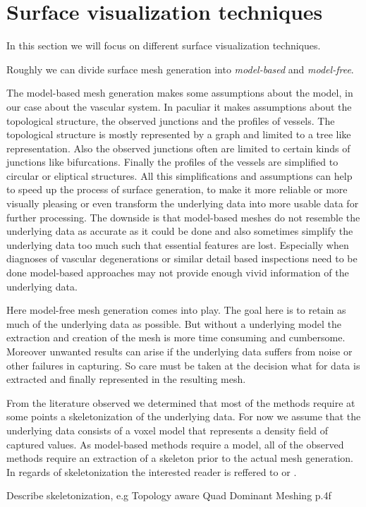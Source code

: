 

\section{Surface visualization techniques}

In this section we will focus on different surface visualization techniques.

Roughly we can divide surface mesh generation into \emph{model-based} and \emph{model-free}.

The model-based mesh generation makes some assumptions about the model, in our case about the vascular system.
In paculiar it makes assumptions about the topological structure, the observed junctions and the profiles of vessels. The topological structure is mostly represented by a graph and limited to a tree like representation. Also the observed junctions often are limited to certain kinds of junctions like bifurcations. Finally the profiles of the vessels are simplified to circular or eliptical structures.
All this simplifications and assumptions can help to speed up the process of surface generation, to make it more reliable or more visually pleasing or even transform the underlying data into more usable data for further processing. The downside is that model-based meshes do not resemble the underlying data as accurate as it could be done and also sometimes simplify the underlying data too much such that essential features are lost.
Especially when diagnoses of vascular degenerations or similar detail based inspections need to be done model-based approaches may not provide enough vivid information of the underlying data.

Here model-free mesh generation comes into play. The goal here is to retain as much of the underlying data as possible. But without a underlying model the extraction and creation of the mesh is more time consuming and cumbersome. Moreover unwanted results can arise if the underlying data suffers from noise or other failures in capturing. So care must be taken at the decision what for data is extracted and finally represented in the resulting mesh.

From the literature observed we determined that most of the methods require at some points a skeletonization of the underlying data. For now we assume that the underlying data consists of a voxel model that represents a density field of captured values. As model-based methods require a model, all of the observed methods require an extraction of a skeleton prior to the actual mesh generation. In regards of skeletonization the interested reader is reffered to \cite{ebert2002augmented} or \cite{strzodka2004generalized}.



Describe skeletonization, e.g Topology aware Quad Dominant Meshing p.4f